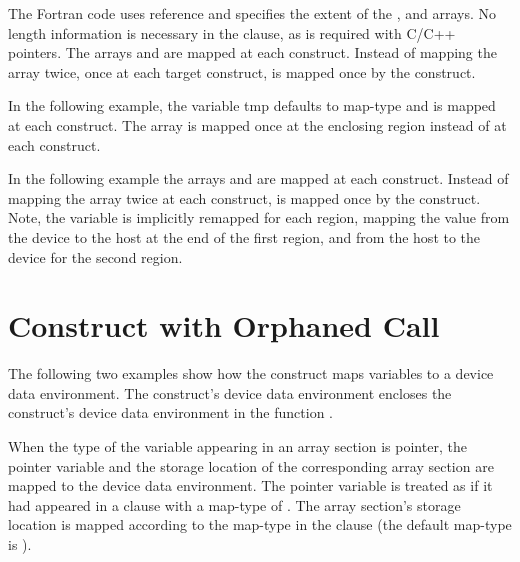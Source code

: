 

The Fortran code uses reference and specifies the extent of the ,  and  arrays. 
No length information is necessary in the  clause, as is required with 
C/C++ pointers. The arrays  and  are mapped at each  construct. 
Instead of mapping the array  twice, once at each target construct,  is mapped 
once by the   construct.


In the following example, the variable tmp defaults to  map-type 
and is mapped at each  construct. The array  is mapped once at 
the enclosing   region instead of at each  
construct. 


In the following example the arrays  and  are mapped at each  
construct. Instead of mapping the array  twice at each  construct, 
 is mapped once by the   construct. Note, the  
variable is implicitly remapped for each  region, mapping the value 
from the device to the host at the end of the first  region, and 
from the host to the device for the second  region.


\section{  Construct with Orphaned Call}

The following two examples show how the   construct 
maps variables to a device data environment. The   
construct's device data environment encloses the  construct's device 
data environment in the function .

When the type of the variable appearing in an array section is pointer, the pointer 
variable and the storage location of the corresponding array section are mapped 
to the device data environment. The pointer variable is treated as if it had appeared 
in a  clause with a map-type of . The array section's 
storage location is mapped according to the map-type in the  clause 
(the default map-type is ).

